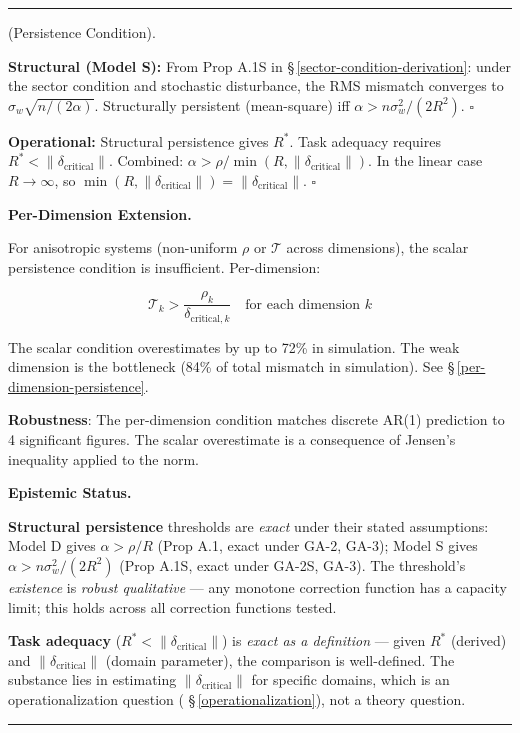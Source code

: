 \documentclass[11pt,oneside]{article}
\newcounter{claim}[section]
\renewcommand{\theclaim}{\thesection.\arabic{claim}}
\newenvironment{segment}[2]{%
  \refstepcounter{claim}%
  \bigskip\noindent\hrule\smallskip
  \noindent{\bfseries #1~\theclaim}\enskip(#2).\par\smallskip
  \noindent\ignorespaces
}{%
  \par\smallskip\noindent\hrule\bigskip
}
\newenvironment{theorem}[1][]{\begin{segment}{Theorem}{#1}}{\end{segment}}
\begin{document}
\begin{theorem}[Persistence Condition]
\textbf{Structural (Model S):} From Prop A.1S in \S\,\ref{sector-condition-derivation}: under the sector condition and stochastic disturbance, the RMS mismatch converges to $\sigma_w\sqrt{n/(2\alpha)}$. Structurally persistent (mean-square) iff $\alpha > n\sigma_w^2/(2R^2)$. $\square$

\textbf{Operational:} Structural persistence gives $R^*$. Task adequacy requires $R^* < \lVert\delta_{\text{critical}}\rVert$. Combined: $\alpha > \rho/\min(R, \lVert\delta_{\text{critical}}\rVert)$. In the linear case $R \to \infty$, so $\min(R, \lVert\delta_{\text{critical}}\rVert) = \lVert\delta_{\text{critical}}\rVert$. $\square$


\medskip\noindent\textbf{Per-Dimension Extension.}



For anisotropic systems (non-uniform $\rho$ or $\mathcal{T}$ across dimensions), the scalar persistence condition is insufficient. Per-dimension:

$$\mathcal{T}_k > \frac{\rho_k}{\delta_{\text{critical},k}} \quad \text{for each dimension } k$$

The scalar condition overestimates by up to 72\% in simulation. The weak dimension is the bottleneck (84\% of total mismatch in simulation). See \S\,\ref{per-dimension-persistence}.

\textbf{Robustness}: The per-dimension condition matches discrete AR(1) prediction to 4 significant figures. The scalar overestimate is a consequence of Jensen's inequality applied to the norm.


\medskip\noindent\textbf{Epistemic Status.}


\textbf{Structural persistence} thresholds are \textit{exact} under their stated assumptions: Model D gives $\alpha > \rho/R$ (Prop A.1, exact under GA-2, GA-3); Model S gives $\alpha > n\sigma_w^2/(2R^2)$ (Prop A.1S, exact under GA-2S, GA-3). The threshold's \textit{existence} is \textit{robust qualitative} — any monotone correction function has a capacity limit; this holds across all correction functions tested.

\textbf{Task adequacy} ($R^* < \lVert\delta_{\text{critical}}\rVert$) is \textit{exact as a definition} — given $R^*$ (derived) and $\lVert\delta_{\text{critical}}\rVert$ (domain parameter), the comparison is well-defined. The substance lies in estimating $\lVert\delta_{\text{critical}}\rVert$ for specific domains, which is an operationalization question ( \S\,\ref{operationalization}), not a theory question.


\end{theorem}
\end{document}
